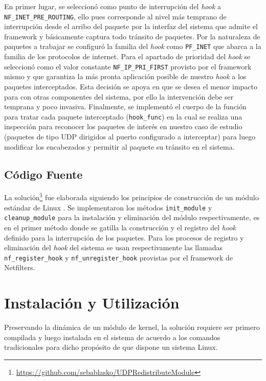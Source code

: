 En primer lugar, se seleccionó como punto de interrupción del \emph{hook} a \verb=NF_INET_PRE_ROUTING=, ello pues corresponde al nivel más temprano de interrupción desde el arribo del paquete por la interfaz del sistema que admite el framework y básicamente captura todo tránsito de paquetes. Por la naturaleza de paquetes a trabajar se configuró la familia del \emph{hook} como \verb=PF_INET= que abarca a la familia de los protocolos de internet. Para el apartado de prioridad del \emph{hook} se seleccionó como el valor constante \verb=NF_IP_PRI_FIRST= provisto por el framework mismo y que garantiza la más pronta aplicación posible de nuestro \emph{hook} a los paquetes interceptados. Esta decisión se apoya en que se desea el menor impacto para con otras componentes del sistema, por ello la intervención debe ser temprana y poco invasiva. Finalmente, se implementó el cuerpo de la función para tratar cada paquete interceptado (\verb=hook_func=) en la cual se realiza una inspección para reconocer los paquetes de interés en nuestro caso de estudio (paquetes de tipo UDP dirigidos al puerto configurado a interceptar) para luego modificar los encabezados y permitir al paquete su tránsito en el sistema.

\subsection{Código Fuente}
La solución\footnote{\url{https://github.com/sebablasko/UDPRedistributeModule}} fue elaborada siguiendo los principios de construcción de un módulo estándar de Linux \cite{report:netfilterModule}. Se implementaron los métodos \verb=init_module= y \verb=cleanup_module= para la instalación y eliminación del módulo respectivamente, es en el primer método donde se gatilla la construcción y el registro del \emph{hook} definido para la interrupción de los paquetes. Para los procesos de registro y eliminación del \emph{hook} del sistema se usan respectivamente las llamadas \verb=nf_register_hook= y \verb=nf_unregister_hook= provistas por el framework de Netfilters.

\section{Instalación y Utilización}
Preservando la dinámica de un módulo de kernel, la solución requiere ser primero compilada y luego instalada en el sistema de acuerdo a los comandos tradicionales para dicho propósito de que dispone un sistema Linux.

